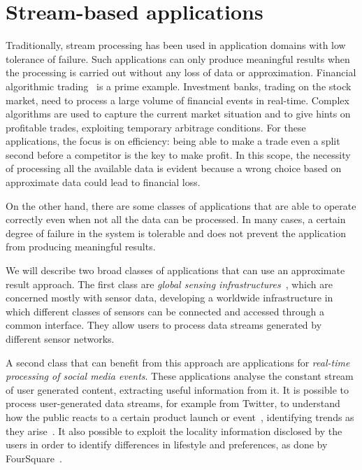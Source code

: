 \section{Stream-based applications}
\vspace{-10pt}
Traditionally, stream processing has been used in application domains with low tolerance
of failure. Such applications can only produce meaningful results when the processing is carried
out without any loss of data or approximation.
Financial algorithmic trading~\cite{streambase-algo} is a prime example. 
Investment banks, trading on the stock market, need to process a large volume of financial events in
real-time.
Complex algorithms are used to capture the current market situation and to give hints on
profitable trades, exploiting temporary arbitrage conditions. For these applications, the focus is on
efficiency: being able to make a trade even a split second before a competitor is the key to make
profit.
In this scope, the necessity of processing all the available data is evident because a wrong choice
based on approximate data could lead to financial loss.

On the other hand, there are some classes of applications that are able to operate correctly even when
not all the data can be processed. In many cases, a certain degree of failure in the system is
tolerable and does not prevent the application from producing meaningful results.

We will describe two broad classes of applications that can use an approximate result approach.  
The first class are \emph{global sensing infrastructures}~\cite{senseweb,gsn,irisnet}, which are
concerned mostly with sensor data, developing a worldwide infrastructure in which different classes of
sensors can be connected and accessed through a common interface. They allow users to process data
streams generated by different sensor networks.
 
A second class that can benefit from this approach are applications for \emph{real-time
processing of social media events}. These applications analyse the constant stream of user generated
content, extracting useful information from it. It is possible to process user-generated data
streams, for example from Twitter, to understand how the public reacts to a certain product launch or
event~\cite{twitter-sentiment,twitrratr}, identifying trends as they
arise~\cite{twitter-stocks,twitter-sentiment-1}. It also possible to exploit the locality
information disclosed by the users in order to identify differences in lifestyle and
preferences, as done by FourSquare~\cite{foursquare-wsj,foursquare-rude}.
\vspace{-15pt}
